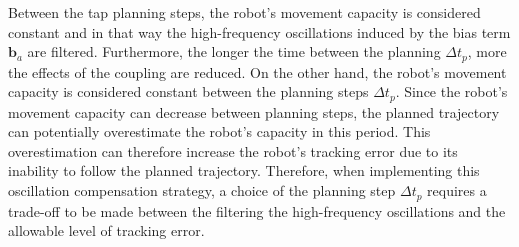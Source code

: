 Between the \gls{tap} planning steps, the robot's movement capacity is considered constant and in that way the high-frequency oscillations induced by the bias term $\bm{b}_a$ are filtered. Furthermore, the longer the time between the planning $\Delta t_p$, more the effects of the coupling are reduced. On the other hand, the robot's movement capacity is considered constant between the planning steps $\Delta t_p$. Since the robot's movement capacity can decrease between planning steps, the planned trajectory can potentially overestimate the robot's capacity in this period. This overestimation can therefore increase the robot's tracking error due to its inability to follow the planned trajectory.
Therefore, when implementing this oscillation compensation strategy, a choice of the planning step $\Delta t_p$ requires a trade-off to be made between the filtering the high-frequency oscillations and the allowable level of tracking error. 
 








